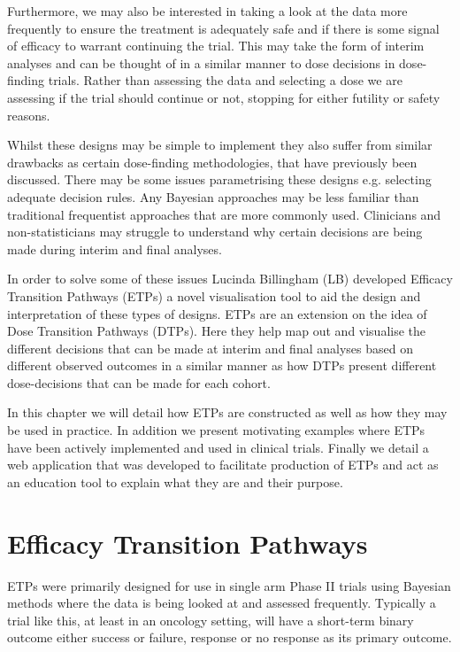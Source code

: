 Furthermore, we may also be interested in taking a look at the data more frequently to ensure the treatment is adequately safe and if there is some signal of efficacy to warrant continuing the trial. This may take the form of interim analyses and can be thought of in a similar manner to dose decisions in dose-finding trials. Rather than assessing the data and selecting a dose we are assessing if the trial should continue or not, stopping for either futility or safety reasons.  

Whilst these designs may be simple to implement they also suffer from similar drawbacks as certain dose-finding methodologies, that have previously been discussed. There may be some issues parametrising these designs e.g. selecting adequate decision rules. Any Bayesian approaches may be less familiar than traditional frequentist approaches that are more commonly used. Clinicians and non-statisticians may struggle to understand why certain decisions are being made during interim and final analyses. 

In order to solve some of these issues Lucinda Billingham (LB) developed Efficacy Transition Pathways (ETPs) a novel visualisation tool to aid the design and interpretation of these types of designs. ETPs are an extension on the idea of Dose Transition Pathways (DTPs). Here they help map out and visualise the different decisions that can be made at interim and final analyses based on different observed outcomes in a similar manner as how DTPs present different dose-decisions that can be made for each cohort. 

In this chapter we will detail how ETPs are constructed as well as how they may be used in practice. In addition we present motivating examples where ETPs have been actively implemented and used in clinical trials. Finally we detail a web application that was developed to facilitate production of ETPs and act as an education tool to explain what they are and their purpose. 


\section{Efficacy Transition Pathways}
\label{etp:ETPs}

ETPs were primarily designed for use in single arm Phase \RN{2} trials using Bayesian methods where the data is being looked at and assessed frequently. Typically a trial like this, at least in an oncology setting, will have a short-term binary outcome either success or failure, response or no response as its primary outcome. 

